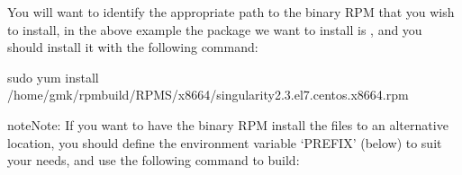 \documentclass[letterpaper,10pt,english]{sphinxmanual}
\begin{document}
%
\begin{sphinxVerbatim}[commandchars=\\\{\}]
 

 

 

 

\end{sphinxVerbatim}

You will want to identify the appropriate path to the binary RPM that
you wish to install, in the above example the package we want to install
is  , and you should install it with the following command:

%
\begin{sphinxVerbatim}[commandchars=\\\{\}]
\PYGZdl{} sudo yum install /home/gmk/rpmbuild/RPMS/x86\PYGZus{}64/singularity\PYGZhy{}2.3.el7.centos.x86\PYGZus{}64.rpm
\end{sphinxVerbatim}

\begin{sphinxadmonition}{note}{Note:}
If you want to have the binary RPM install the files to an
alternative location, you should define the environment variable
‘PREFIX’ (below) to suit your needs, and use the following command to
build:
\end{sphinxadmonition}
\end{document}
